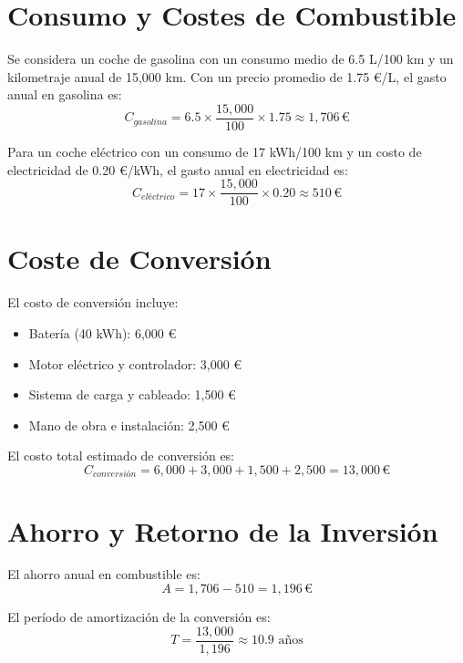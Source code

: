 \documentclass[10pt, a4paper, twoside, twocolumn]{article}
\begin{document}
\begin{Form}
	\section{Consumo y Costes de Combustible}
	Se considera un coche de gasolina con un consumo medio de 6.5 L/100 km y un kilometraje anual de 15,000 km. Con un precio promedio de 1.75 €/L, el gasto anual en gasolina es:
	\begin{equation}
	C_{gasolina} = 6.5 \times \frac{15,000}{100} \times 1.75 \approx 1,706 \,\text{€}
	\end{equation}
	
	Para un coche eléctrico con un consumo de 17 kWh/100 km y un costo de electricidad de 0.20 €/kWh, el gasto anual en electricidad es:
	\begin{equation}
	C_{eléctrico} = 17 \times \frac{15,000}{100} \times 0.20 \approx 510 \,\text{€}
	\end{equation}
	
	\section{Coste de Conversión}
	El costo de conversión incluye:
	\begin{itemize}
		\item Batería (40 kWh): 6,000 €
		\item Motor eléctrico y controlador: 3,000 €
		\item Sistema de carga y cableado: 1,500 €
		\item Mano de obra e instalación: 2,500 €
	\end{itemize}
	El costo total estimado de conversión es:
	\begin{equation}
	C_{conversión} = 6,000 + 3,000 + 1,500 + 2,500 = 13,000 \,\text{€}
	\end{equation}
	
	\section{Ahorro y Retorno de la Inversión}
	El ahorro anual en combustible es:
	\begin{equation}
	A = 1,706 - 510 = 1,196 \,\text{€}
	\end{equation}
	
	El período de amortización de la conversión es:
	\begin{equation}
	T = \frac{13,000}{1,196} \approx 10.9 \text{ años}
	\end{equation}
	

\end{Form}
\end{document}
